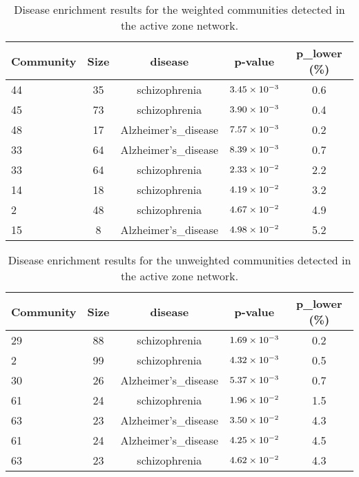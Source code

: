 \begin{table}
    \centering
    \begin{tabular}{l c c c c}
        \small
        Community & Size & disease & p-value & p_lower (\%) \\ 
        \hline
        44 & 35 & schizophrenia & $3.45\times 10^{-3}$ & 0.6 \\ 
        45 & 73 & schizophrenia & $3.90\times 10^{-3}$ & 0.4 \\ 
        48 & 17 & Alzheimer's_disease & $7.57\times 10^{-3}$ & 0.2 \\ 
        33 & 64 & Alzheimer's_disease & $8.39\times 10^{-3}$ & 0.7 \\ 
        33 & 64 & schizophrenia & $2.33\times 10^{-2}$ & 2.2 \\ 
        14 & 18 & schizophrenia & $4.19\times 10^{-2}$ & 3.2 \\ 
        2 & 48 & schizophrenia & $4.67\times 10^{-2}$ & 4.9 \\ 
        15 & 8 & Alzheimer's_disease & $4.98\times 10^{-2}$ & 5.2 \\ 
    \end{tabular}
    \caption{Disease enrichment results for the weighted communities detected in the active zone network.}
    \label{tab:wdisease}
\end{table}
    

\begin{table}
    \centering
    \begin{tabular}{l c c c c }
        \small
        Community & Size & disease & p-value & p_lower (\%) \\ 
        \hline
        29 & 88 & schizophrenia & $1.69\times 10^{-3}$ & 0.2 \\ 
        2 & 99 & schizophrenia & $4.32\times 10^{-3}$ & 0.5 \\ 
        30 & 26 & Alzheimer's_disease & $5.37\times 10^{-3}$ & 0.7 \\ 
        61 & 24 & schizophrenia & $1.96\times 10^{-2}$ & 1.5 \\ 
        63 & 23 & Alzheimer's_disease & $3.50\times 10^{-2}$ & 4.3 \\ 
        61 & 24 & Alzheimer's_disease & $4.25\times 10^{-2}$ & 4.5 \\ 
        63 & 23 & schizophrenia & $4.62\times 10^{-2}$ & 4.3 \\ 
    \end{tabular}
    \caption{Disease enrichment results for the unweighted communities detected in the active zone network.}
    \label{tab:uwdisease}
\end{table}

